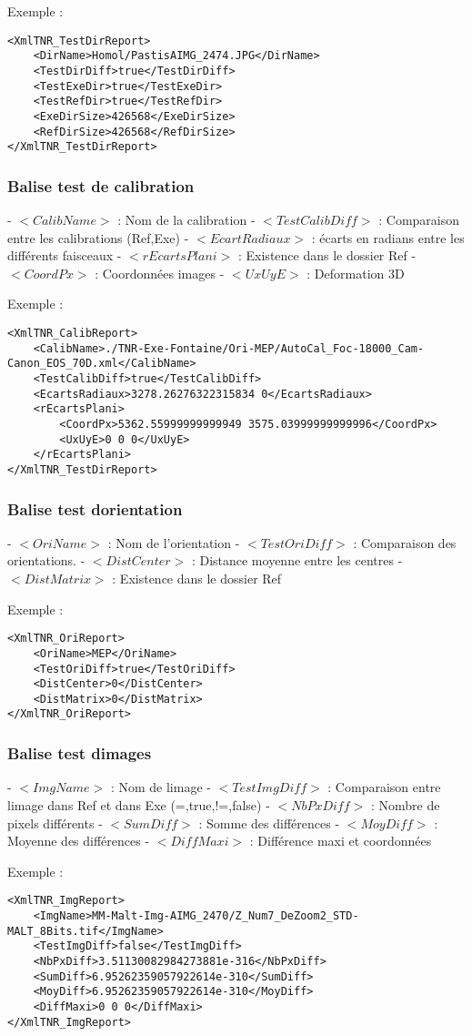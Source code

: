 \documentclass[a4paper]{book}
\begin{document}
Exemple : 
\begin{verbatim}
<XmlTNR_TestDirReport>
	<DirName>Homol/PastisAIMG_2474.JPG</DirName>
	<TestDirDiff>true</TestDirDiff>
	<TestExeDir>true</TestExeDir>
	<TestRefDir>true</TestRefDir>
	<ExeDirSize>426568</ExeDirSize>
	<RefDirSize>426568</RefDirSize>
</XmlTNR_TestDirReport>
\end{verbatim}

\subsubsection{Balise test de calibration}
	- $<CalibName>$ : Nom de la calibration
	- $<TestCalibDiff>$ : Comparaison entre les calibrations (Ref,Exe)
	- $<EcartRadiaux>$ : \'ecarts en radians entre les diff\'erents faisceaux
	- $<rEcartsPlani>$ : Existence dans le dossier Ref
		- $<CoordPx>$ : Coordonn\'ees images
		- $<UxUyE>$ : Deformation 3D

Exemple :
\begin{verbatim}
<XmlTNR_CalibReport>
	<CalibName>./TNR-Exe-Fontaine/Ori-MEP/AutoCal_Foc-18000_Cam-Canon_EOS_70D.xml</CalibName>
	<TestCalibDiff>true</TestCalibDiff>
	<EcartsRadiaux>3278.26276322315834 0</EcartsRadiaux>
	<rEcartsPlani>
		<CoordPx>5362.55999999999949 3575.03999999999996</CoordPx>
		<UxUyE>0 0 0</UxUyE>
	</rEcartsPlani>
</XmlTNR_TestDirReport>
\end{verbatim}

\subsubsection{Balise test dorientation}
	- $<OriName>$ : Nom de l’orientation
	- $<TestOriDiff>$ : Comparaison des orientations.
	- $<DistCenter>$ : Distance moyenne entre les centres 
	- $<DistMatrix>$ : Existence dans le dossier Ref

Exemple : 
\begin{verbatim}
<XmlTNR_OriReport>
	<OriName>MEP</OriName>
	<TestOriDiff>true</TestOriDiff>
	<DistCenter>0</DistCenter>
	<DistMatrix>0</DistMatrix>
</XmlTNR_OriReport>
\end{verbatim}

\subsubsection{Balise test dimages}
	- $<ImgName>$ : Nom de limage
	- $<TestImgDiff>$ : Comparaison entre limage dans Ref et dans Exe (=,true,!=,false)
	- $<NbPxDiff>$ : Nombre de pixels diff\'erents
	- $<SumDiff>$ : Somme des diff\'erences
	- $<MoyDiff>$ : Moyenne des diff\'erences
	- $<DiffMaxi>$ : Diff\'erence maxi et coordonn\'ees

Exemple : 
\begin{verbatim}
<XmlTNR_ImgReport>
	<ImgName>MM-Malt-Img-AIMG_2470/Z_Num7_DeZoom2_STD-MALT_8Bits.tif</ImgName>
	<TestImgDiff>false</TestImgDiff>
	<NbPxDiff>3.51130082984273881e-316</NbPxDiff>
	<SumDiff>6.95262359057922614e-310</SumDiff>
	<MoyDiff>6.95262359057922614e-310</MoyDiff>
	<DiffMaxi>0 0 0</DiffMaxi>
</XmlTNR_ImgReport>
\end{verbatim}
\end{document}
